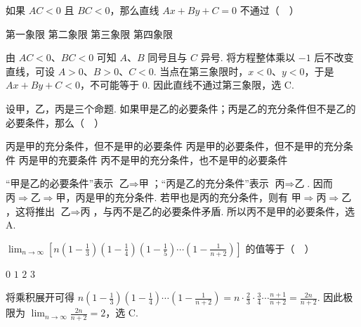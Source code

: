 \begin{problem}
如果 \(AC<0\) 且 \(BC<0\)，那么直线 \(Ax+By+C=0\) 不通过（\(\quad\)）

\choices
    {第一象限}
    {第二象限}
    {第三象限}
    {第四象限}


\begin{solution}
由 \(AC<0\)、\(BC<0\) 可知 \(A\)、\(B\) 同号且与 \(C\) 异号. 将方程整体乘以 \(-1\) 后不改变直线，可设 \(A>0\)、\(B>0\)、\(C<0\). 当点在第三象限时，\(x<0\)、\(y<0\)，于是 \(Ax+By+C<0\)，不可能等于 \(0\). 因此直线不通过第三象限，选 C.
\end{solution}
\end{problem}

\begin{problem}
设甲，乙，丙是三个命题. 如果甲是乙的必要条件；丙是乙的充分条件但不是乙的必要条件，那么（\(\quad\)）

\choices
    {丙是甲的充分条件，但不是甲的必要条件}
    {丙是甲的必要条件，但不是甲的充分条件}
    {丙是甲的充要条件}
    {丙不是甲的充分条件，也不是甲的必要条件}


\begin{solution}
“甲是乙的必要条件”表示 \(\text{乙}\Rightarrow\text{甲}\)；“丙是乙的充分条件”表示 \(\text{丙}\Rightarrow\text{乙}\). 因而 \(\text{丙}\Rightarrow\text{乙}\Rightarrow\text{甲}\)，丙是甲的充分条件. 若甲也是丙的充分条件，则有 \(\text{甲}\Rightarrow\text{丙}\Rightarrow\text{乙}\)，这将推出 \(\text{乙}\Rightarrow\text{丙}\)，与丙不是乙的必要条件矛盾. 所以丙不是甲的必要条件，选 A.
\end{solution}
\end{problem}

\begin{problem}
\(\displaystyle\lim_{n\to\infty}\left[n\left(1-\frac{1}{3}\right)\left(1-\frac{1}{4}\right)\left(1-\frac{1}{5}\right)\cdots\left(1-\frac{1}{n+2}\right)\right]\) 的值等于（\(\quad\)）

\choices
    {\(0\)}
    {\(1\)}
    {\(2\)}
    {\(3\)}


\begin{solution}
将乘积展开可得
\(n\left(1-\frac{1}{3}\right)\left(1-\frac{1}{4}\right)\cdots\left(1-\frac{1}{n+2}\right)=n\cdot\frac{2}{3}\cdot\frac{3}{4}\cdots\frac{n+1}{n+2}=\frac{2n}{n+2}\). 因此极限为 \(\displaystyle\lim_{n\to\infty}\frac{2n}{n+2}=2\)，选 C.
\end{solution}
\end{problem}

